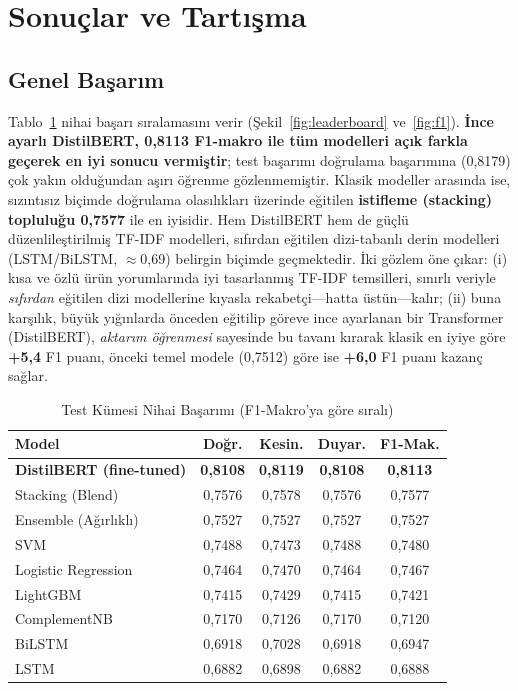 \documentclass[conference]{IEEEtran}
\newcommand{\dpos}[1]{\textcolor[rgb]{0.10,0.49,0.13}{\textbf{#1}}}
\begin{document}
\section{Sonuçlar ve Tartışma}
\subsection{Genel Başarım}
Tablo~\ref{tab:final} nihai başarı sıralamasını verir (Şekil~\ref{fig:leaderboard}
ve~\ref{fig:f1}). \textbf{İnce ayarlı DistilBERT, 0,8113 F1-makro ile tüm modelleri
açık farkla geçerek en iyi sonucu vermiştir}; test başarımı doğrulama başarımına
(0,8179) çok yakın olduğundan aşırı öğrenme gözlenmemiştir. Klasik modeller arasında
ise, sızıntısız biçimde doğrulama olasılıkları üzerinde eğitilen \textbf{istifleme
(stacking) topluluğu 0,7577} ile en iyisidir. Hem DistilBERT hem de güçlü
düzenlileştirilmiş TF-IDF modelleri, sıfırdan eğitilen dizi-tabanlı derin modelleri
(LSTM/BiLSTM, $\approx$0,69) belirgin biçimde geçmektedir. İki gözlem öne çıkar:
(i) kısa ve özlü ürün yorumlarında iyi tasarlanmış TF-IDF temsilleri, sınırlı
veriyle \emph{sıfırdan} eğitilen dizi modellerine kıyasla rekabetçi---hatta
üstün---kalır; (ii) buna karşılık, büyük yığınlarda önceden eğitilip göreve ince
ayarlanan bir Transformer (DistilBERT), \emph{aktarım öğrenmesi} sayesinde bu
tavanı kırarak klasik en iyiye göre \dpos{+5,4} F1 puanı, önceki temel modele
(0,7512) göre ise \dpos{+6,0} F1 puanı kazanç sağlar.

\begin{table}[htbp]
\caption{Test Kümesi Nihai Başarımı (F1-Makro'ya göre sıralı)}
\label{tab:final}
\centering
\small
\begin{tabular}{lcccc}
\toprule
\textbf{Model} & \textbf{Doğr.} & \textbf{Kesin.} & \textbf{Duyar.} & \textbf{F1-Mak.}\\
\midrule
\textbf{DistilBERT (fine-tuned)} & \textbf{0,8108} & \textbf{0,8119} & \textbf{0,8108} & \textbf{0,8113}\\
Stacking (Blend)             & 0,7576 & 0,7578 & 0,7576 & 0,7577\\
Ensemble (Ağırlıklı)         & 0,7527 & 0,7527 & 0,7527 & 0,7527\\
SVM                          & 0,7488 & 0,7473 & 0,7488 & 0,7480\\
Logistic Regression          & 0,7464 & 0,7470 & 0,7464 & 0,7467\\
LightGBM                     & 0,7415 & 0,7429 & 0,7415 & 0,7421\\
ComplementNB                 & 0,7170 & 0,7126 & 0,7170 & 0,7120\\
BiLSTM                       & 0,6918 & 0,7028 & 0,6918 & 0,6947\\
LSTM                         & 0,6882 & 0,6898 & 0,6882 & 0,6888\\
\bottomrule
\end{tabular}
\end{table}
\end{document}
